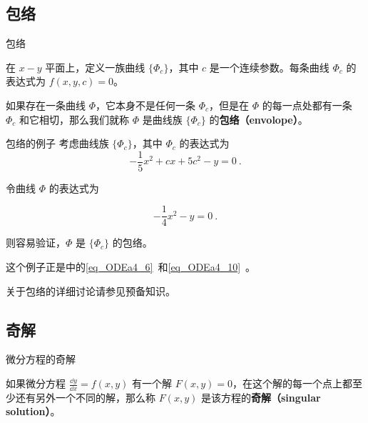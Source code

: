 

\subsection{包络}

\begin{definition}{包络}

在 $x-y$ 平面上，定义一族曲线 $\{\Phi_c\}$，其中 $c$ 是一个连续参数。每条曲线 $\Phi_c$ 的表达式为 $f(x, y, c)=0$。

如果存在一条曲线 $\Phi$，它本身不是任何一条 $\Phi_c$，但是在 $\Phi$ 的每一点处都有一条 $\Phi_c$ 和它相切，那么我们就称 $\Phi$ 是曲线族 $\{\Phi_c\}$ 的\textbf{包络（envolope）}。

\end{definition}

\begin{example}{包络的例子}
考虑曲线族 $\{\Phi_c\}$，其中 $\Phi_c$ 的表达式为
\begin{equation}
-\frac{1}{5}x^2+cx+5c^2-y=0~.
\end{equation}

令曲线 $\Phi$ 的表达式为

\begin{equation}
-\frac{1}{4}x^2-y=0~.
\end{equation}

则容易验证，$\Phi$ 是 $\{\Phi_c\}$ 的包络。

这个例子正是中的\autoref{eq_ODEa4_6}~和\autoref{eq_ODEa4_10}~。

\end{example}

关于包络的详细讨论请参见预备知识。


\subsection{奇解}

\begin{definition}{微分方程的奇解}

如果微分方程 $\frac{\dd y}{\dd x}=f(x, y)$ 有一个解 $F(x, y)=0$，在这个解的每一个点上都至少还有另外一个不同的解，那么称 $F(x, y)$ 是该方程的\textbf{奇解（singular solution）}。

\end{definition}

